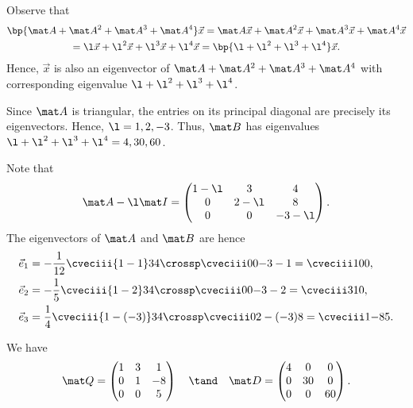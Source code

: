\begin{solution}
    \begin{ppart}
        Observe that
        \begin{gather*}
            \bp{\mat A + \mat A^2 + \mat A^3 + \mat A^4} \vec x = \mat A \vec x + \mat A^2 \vec x + \mat A^3 \vec x + \mat A^4 \vec x\\
            = \l \vec x + \l^2 \vec x + \l^3 \vec x + \l^4 \vec x = \bp{\l + \l^2 + \l^3 + \l^4} \vec x.
        \end{gather*}
        Hence, $\vec x$ is also an eigenvector of $\mat A + \mat A^2 + \mat A^3 + \mat A^4$ with corresponding eigenvalue $\l + \l^2 + \l^3 + \l^4$.
    \end{ppart}
    \begin{ppart}
        Since $\mat A$ is triangular, the entries on its principal diagonal are precisely its eigenvectors. Hence, $\l = 1, 2, -3$. Thus, $\mat B$ has eigenvalues $\l + \l^2 + \l^3 + \l^4 = 4, 30, 60$.

        Note that \[\mat A - \l \mat I = \begin{pmatrix}1 - \l & 3 & 4 \\ 0 & 2-\l & 8 \\ 0 & 0 & -3-\l\end{pmatrix}.\] The eigenvectors of $\mat A$ and $\mat B$ are hence 
        \begin{align*}
            \vec e_1 &= -\frac1{12} \cveciii{1-1}34 \crossp \cveciii00{-3-1} = \cveciii100,\\
            \vec e_2 &= -\frac15 \cveciii{1-2}34 \crossp \cveciii00{-3-2} = \cveciii310,\\
            \vec e_3 &= \frac14 \cveciii{1-(-3)}34 \crossp \cveciii0{2-(-3)}8 = \cveciii1{-8}5.
        \end{align*}
    \end{ppart}
    \begin{ppart}
        We have \[\mat Q = \begin{pmatrix}1 & 3 & 1 \\ 0 & 1 & -8 \\ 0 & 0 & 5\end{pmatrix} \quad \tand \quad \mat D = \begin{pmatrix}4 & 0 & 0 \\ 0 & 30 & 0 \\ 0 & 0 & 60\end{pmatrix}.\]
    \end{ppart}
\end{solution}

